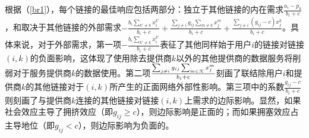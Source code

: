 根据（\ref{br1}），每个链接的最佳响应包括两部分：独立于其他链接的内在需求$\frac{a_i-p_k}{b_i + c}$，和取决于其他链接的外部需求$-\frac{b_i\sum_{k'\neq k}x^{k'}_i}{b_i + c} + \frac {\sum_{j\neq i}g_{ij}\sum_{m\neq k}x_{j}^{m}}{b_i + c} + \frac{\sum_{j\neq i}(g_{ij} -c)x_{j}^{k}}{b_i + c}$。具体来说，对于外部需求，第一项$-\frac{b_i \sum_{k'\neq k}x^{k'}_i}{b_i + c}$表征了其他同样始于用户$i$的链接对链接$(i,k)$的负面影响，这体现了使用除去提供商$k$以外的其他提供商的数据服务将削弱对于服务提供商$k$的数据使用。第二项$\frac{\sum_{j\neq i}g_{ij}\sum_{m\in\mathcal{K}}x_{j}^{m}}{b_i + c}$刻画了联结除用户$i$和提供商$k$的其他链接对于$(i,k)$所产生的正面网络外部性影响。第三项中的系数$\frac{g_{ij}-c}{b_i + c}$则刻画了与提供商$k$连接的其他链接对链接$(i,k)$上需求的边际影响。显然，如果社会效应主导了拥挤效应（即$g_{ij}\geq c$），则边际影响是正面的；而如果拥塞效应占主导地位（即$g_{ij} <c$），则边际影响为负面的。



